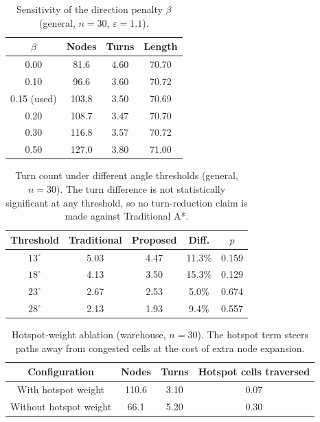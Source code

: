 \begin{table}[htbp]\centering
\caption{Sensitivity of the direction penalty $\beta$ (general, $n=30$, $\varepsilon=1.1$).}
\label{tab:sens_beta}
\begin{tabular}{cccc}\toprule
$\beta$ & Nodes & Turns & Length \\\midrule
0.00 & 81.6 & 4.60 & 70.70 \\
0.10 & 96.6 & 3.60 & 70.72 \\
0.15 (used) & 103.8 & 3.50 & 70.69 \\
0.20 & 108.7 & 3.47 & 70.70 \\
0.30 & 116.8 & 3.57 & 70.72 \\
0.50 & 127.0 & 3.80 & 71.00 \\
\bottomrule\end{tabular}\end{table}

\begin{table}[htbp]\centering
\caption{Turn count under different angle thresholds (general, $n=30$). The turn difference is not statistically significant at any threshold, so no turn-reduction claim is made against Traditional A*.}
\label{tab:turn_thresh}
\begin{tabular}{ccccc}\toprule
Threshold & Traditional & Proposed & Diff. & $p$ \\\midrule
$13^\circ$ & 5.03 & 4.47 & 11.3\% & 0.159 \\
$18^\circ$ & 4.13 & 3.50 & 15.3\% & 0.129 \\
$23^\circ$ & 2.67 & 2.53 & 5.0\% & 0.674 \\
$28^\circ$ & 2.13 & 1.93 & 9.4\% & 0.557 \\
\bottomrule\end{tabular}\end{table}

\begin{table}[htbp]\centering
\caption{Hotspot-weight ablation (warehouse, $n=30$). The hotspot term steers paths away from congested cells at the cost of extra node expansion.}
\label{tab:hotspot_ablation}
\begin{tabular}{cccc}\toprule
Configuration & Nodes & Turns & Hotspot cells traversed \\\midrule
With hotspot weight & 110.6 & 3.10 & 0.07 \\
Without hotspot weight & 66.1 & 5.20 & 0.30 \\
\bottomrule\end{tabular}
\end{table}


